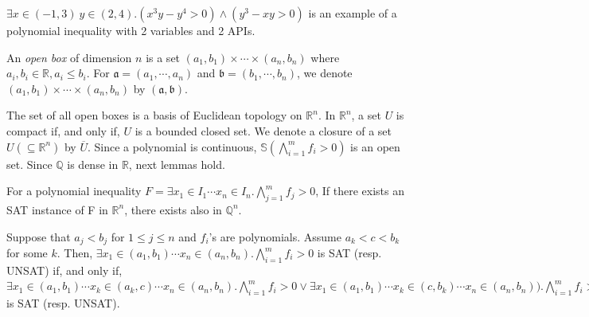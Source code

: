\documentclass[runningheads,a4paper,oribibl]{llncs}
\newcommand{\Real}{{\mathbb R}}
\newcommand{\Rat}{{\mathbb Q}}
\newcommand{\suppress}[1]{} %
\begin{document}
\begin{example} \label{examp:poly_ieq}
$\exists x \in (-1,3)~y \in (2,4) . (x^3y - y^4 > 0) \wedge (y^3 -xy >0)$
is an example of a polynomial inequality with 2 variables and 2 APIs. 
\end{example}

\begin{definition}
An \emph{open box} of dimension $n$ is a set $(a_1,b_1) \times \cdots \times (a_n,b_n)$ 
where $a_i, b_i \in \Real, a_i \leq b_i$.  
For $\mathfrak{a} = (a_1, \cdots, a_n)$ and $\mathfrak{b} = (b_1, \cdots, b_n)$, 
we denote $(a_1,b_1) \times \cdots \times (a_n,b_n)$ by $(\mathfrak{a}, \mathfrak{b})$. 
\end{definition}

The set of all open boxes is a basis of Euclidean topology on $\Real^n$. 
In $\Real^n$, a set $U$ is compact if, and only if, $U$ is a bounded closed set. 
We denote a closure of a set $U (\subseteq \Real^n)$ by $\overline{U}$. 
%
Since a polynomial is continuous, 
$\mathbb{S}(\bigwedge \limits_{i=1}^m f_i > 0)$ is an open set. 
Since $\Rat$ is dense in $\Real$, next lemmas hold. 

\begin{lemma} \label{cor:rattoreal}
For a polynomial inequality
$F = \exists x_1 \in I_1 \cdots x_n \in I_n. \bigwedge \limits_{j=1}^m f_j > 0$, 
If there exists an SAT instance of F in $\Real^n$, there exists also in $\Rat^n$. 
\end{lemma}

\begin{lemma} \label{cor:refinement}
Suppose that $a_j < b_j$ for $1 \leq j \leq n$ and $f_i$'s are polynomials. 
Assume $a_k < c < b_k$ for some $k$. 
Then, 
$\exists x_1 \in (a_1,b_1) \cdots x_n \in (a_n,b_n). \bigwedge \limits_{i=1}^m f_i > 0$ 
is SAT (resp. UNSAT) if, and only if, 
$\exists x_1 \in (a_1,b_1) \cdots x_k \in (a_k,c) \cdots x_n \in (a_n,b_n). 
 \bigwedge \limits_{i=1}^m f_i > 0 
 \vee 
 \exists x_1 \in (a_1,b_1) \cdots x_k \in (c,b_k) \cdots x_n \in (a_n,b_n)). 
 \bigwedge \limits_{i=1}^m f_i > 0$ 
is SAT (resp. UNSAT). 
\end{lemma}

\suppress{
\begin{pf}
We show for the SAT case. If-part is obvious. For only-if-part, 
since $\mathbb{S}(\bigwedge \limits_{i=1}^m f_i > 0)$ is an open set, 
if $y \in (a_1,b_1) \times \cdots \{c\} \cdots \times (a_n,b_n)$ satisfies 
$\bigwedge \limits_{i=1}^m f_i > 0$, 
there exists $x_1 \in (a_1,b_1) \cdots x_k \in (a_k,c) \cdots x_n \in (a_n,b_n)$
(also $x_1 \in (a_1,b_1) \cdots x_k \in (c,b_k) \cdots x_n \in (a_n,b_n)$) that satisfies
$\bigwedge \limits_{i=1}^m f_i > 0$. 
\end{pf}
}
\end{document}
